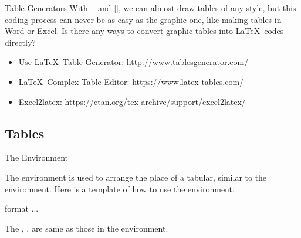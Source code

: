 \begin{frame}[fragile]{Table Generators}
	With \LC|\multirow| and \LC|\multicolumn|, we can almost draw tables of any style, but this coding process can never be as easy as the graphic one, like making tables in Word or Excel. Is there any ways to convert graphic tables into \LaTeX\ codes directly?\\
	\begin{itemize}
		\item Use \LaTeX\ Table Generator: \url{http://www.tablesgenerator.com/}
		\item \LaTeX\ Complex Table Editor: \url{https://www.latex-tables.com/}
		\item Excel2latex: \url{https://ctan.org/tex-archive/support/excel2latex/}
	\end{itemize}
\end{frame}

\subsection{Tables}

\begin{frame}[fragile]{The  Environment}

The  environment is used to arrange the place of a tabular, similar to the  environment. Here is a template of how to use the environment.

\begin{command}
\begin{LCL}
\begin{table}[position]
  \centering
  \begin{tabular}{format}
    ...
  \end{tabular}
  \caption{caption}
  \label{table:label}
\end{table}
\end{LCL}
\end{command}

The , ,  are same as those in the  environment. 
\end{frame}

